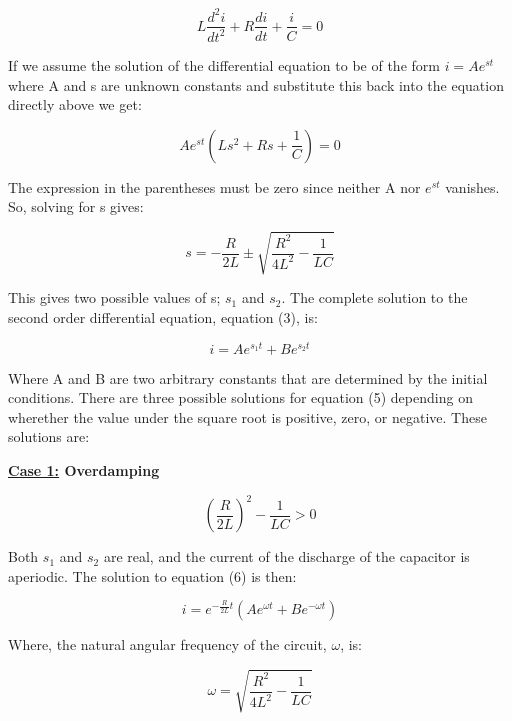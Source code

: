 \documentclass[twocolumn, letterpaper, 10pt, twoside]{article}
\begin{document}
 \begin{equation}
L\frac{d^2i}{dt^2} + R\frac{di}{dt} + \frac{i}{C} = 0
 \end{equation}  
 
 If we assume the solution of the differential equation to be of the form $i = Ae^{st}$ where A and s are unknown constants and substitute this back into the equation directly above we get: 
 
   \begin{equation}
Ae^{st}(Ls^2 + Rs + \frac{1}{C}) = 0 
 \end{equation}
 
 The expression in the parentheses must be zero since neither A nor $e^{st}$ vanishes. So, solving for s gives: 
 
  \begin{equation}
s = -\frac{R}{2L} \pm \sqrt{\frac{R^2}{4L^2} - \frac{1}{LC}}
 \end{equation}
 
 This gives two possible values of s; $s_1$ and $s_2$. The complete solution to the second order differential equation, equation (3), is: 
 
   \begin{equation}
i = Ae^{s_1t} + Be^{s_2t}
 \end{equation}
 
 Where A and B are two arbitrary constants that are determined by the initial conditions. There are three possible solutions for equation (5) depending on wherether the value under the square root is positive, zero, or negative. These solutions are: 
 
 \textbf{\underline{Case 1:} Overdamping}
 
\begin{equation}
(\frac{R}{2L})^2 - \frac{1}{LC} > 0 
\end{equation}

Both $s_1$ and $s_2$ are real, and the current of the discharge of the capacitor is aperiodic. The solution to equation (6) is then: 

   \begin{equation}
i = e^{-\frac{R}{2L}t}(Ae^{\omega t} + Be^{-\omega t})
\end{equation}

Where, the natural angular frequency of the circuit, $\omega$,  is: 

   \begin{equation}
\omega = \sqrt{\frac{R^2}{4L^2} - \frac{1}{LC}}
\end{equation}
  
\end{document}
